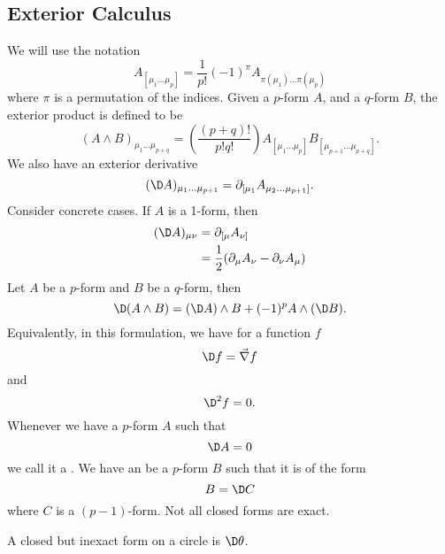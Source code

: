\subsection{Exterior Calculus}
We will use the notation
\begin{equation}
A_{[\mu_{1}\dots\mu_{p}]}=\frac{1}{p!}(-1)^{\pi}A_{\pi(\mu_{1})\dots\pi(\mu_{p})}
\end{equation}
where $\pi$ is a permutation of the indices. Given a $p$-form
$A$, and a $q$-form $B$, the exterior product is defined to be
\begin{equation}
(A\wedge B)_{\mu_{1}\dots\mu_{p+q}}
=\left(\frac{(p+q)!}{p!q!}\right)A_{[\mu_{1}\dots\mu_{p}]}B_{[\mu_{p+1}\dots\mu_{p+q}]}.
\end{equation}
We also have an exterior derivative
\begin{equation}
(\D A)_{\mu_{1}\dots\mu_{p+1}}=\partial_{[\mu_{1}}A_{\mu_{2}\dots\mu_{p+1}]}.
\end{equation}
Consider concrete cases. If $A$ is a 1-form, then
\begin{equation}
\begin{split}
(\D A)_{\mu\nu}
&=\partial_{[\mu}A_{\nu]}\\
&=\frac{1}{2}(\partial_{\mu}A_{\nu}-\partial_{\nu}A_{\mu})
\end{split}
\end{equation}
Let $A$ be a $p$-form and $B$ be a $q$-form, then
\begin{equation}
\D(A\wedge B)=(\D A)\wedge B+(-1)^{p}A\wedge(\D B).
\end{equation}
Equivalently, in this formulation, we have for a function $f$
\begin{equation}
\D f=\vec{\nabla}f
\end{equation}
and
\begin{equation}
\D^{2}f=0.
\end{equation}
Whenever we have a $p$-form $A$ such that
\begin{equation}
\D A=0
\end{equation}
we call it a .
We have an  be a $p$-form $B$ such that it is
of the form
\begin{equation}
B=\D C
\end{equation}
where $C$ is a $(p-1)$-form. Not all closed forms are exact.
\begin{ex}
A closed but inexact form on a circle is $\D\theta$.
\end{ex}

